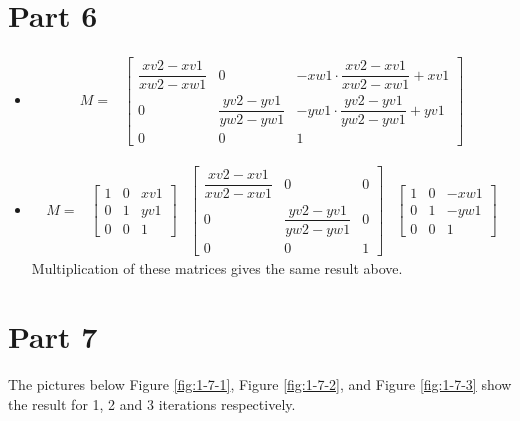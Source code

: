 \section{Part 6}
\label{sec:del-6}


\begin{itemize}
  \item 



\begin{align*}
  M = & \begin{bmatrix}
          \dfrac{xv2 - xv1}{xw2 - xw1} & 0 &
          -xw1 \cdot \dfrac{xv2 - xv1}{xw2 -
            xw1} + xv1 \\
          0 & \dfrac{yv2 - yv1}{yw2 - yw1} &
          -yw1 \cdot \dfrac{yv2 - yv1}{yw2 -
            yw1} + yv1 \\
          0 & 0 & 1
        \end{bmatrix}
\end{align*}

  \item 
\begin{align*}
  M = & \begin{bmatrix}
          1 & 0 & xv1 \\
          0 & 1 & yv1 \\
          0 & 0 & 1
        \end{bmatrix} 
& \begin{bmatrix}
          \dfrac{xv2 - xv1}{xw2 - xw1} & 0 & 0 \\
          0 & \dfrac{yv2 - yv1}{yw2 - yw1} &  0 \\
          0 & 0 & 1
        \end{bmatrix} 
& \begin{bmatrix}
          1 & 0 & -xw1 \\
          0 & 1 & -yw1 \\
          0 & 0 & 1
        \end{bmatrix} 
\end{align*}
Multiplication of these matrices gives the same result above. 
\end{itemize}

\section{Part 7}
\label{sec:del-7}

The pictures below 
Figure \ref{fig:1-7-1}, 
Figure \ref{fig:1-7-2}, and Figure \ref{fig:1-7-3} show the result for 1, 2 and 3 iterations respectively.

